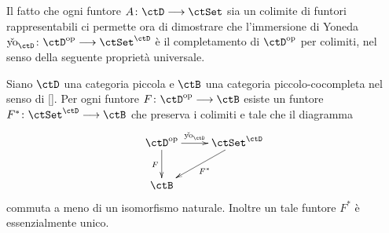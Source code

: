 Il fatto che ogni funtore \(A \colon \ctD \fun \ctSet\) sia un colimite di funtori rappresentabili ci permette ora di dimostrare che l'immersione
di Yoneda \(\coyon_{\ctD} \colon \ctD^{\op} \fun \ctSet^{\ctD}\) è il completamento di \(\ctD^{\op}\) per colimiti, nel senso della seguente proprietà universale.

\begin{proposition}\label{prop_univ_yon}
 Siano \(\ctD\) una categoria piccola e \(\ctB\) una categoria piccolo-cocompleta nel senso di \ref{}. Per ogni funtore \(F \colon \ctD^{\op} \fun \ctB\) esiste un funtore
 \(F^* \colon \ctSet^{\ctD} \fun \ctB\) che preserva i colimiti e tale che il diagramma
 \[\xymatrix{\ctD^{\op} \ar[r]^-{\coyon_{\ctD}} \ar[d]_{F} & \ctSet^{\ctD} \ar[ld]^{F^*} \\
  \ctB}\]
 commuta a meno di un isomorfismo naturale. Inoltre un tale funtore \(F^*\) è essenzialmente unico.
\end{proposition}

